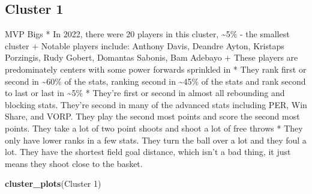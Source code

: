 \documentclass[
]{article}
\newenvironment{Shaded}{\begin{snugshade}}{\end{snugshade}}
\newcommand{\FunctionTok}[1]{\textcolor[rgb]{0.13,0.29,0.53}{\textbf{#1}}}
\newcommand{\NormalTok}[1]{#1}
\newcommand{\StringTok}[1]{\textcolor[rgb]{0.31,0.60,0.02}{#1}}
\begin{document}
\hypertarget{cluster-1}{%
\subsection{Cluster 1}\label{cluster-1}}

MVP Bigs * In 2022, there were 20 players in this cluster,
\textasciitilde5\% - the smallest cluster + Notable players include:
Anthony Davis, Deandre Ayton, Kristaps Porzingis, Rudy Gobert, Domantas
Sabonis, Bam Adebayo + These players are predominately centers with some
power forwards sprinkled in * They rank first or second in
\textasciitilde60\% of the stats, ranking second in \textasciitilde45\%
of the stats and rank second to last or last in \textasciitilde5\% *
They're first or second in almost all rebounding and blocking stats.
They're second in many of the advanced stats including PER, Win Share,
and VORP. They play the second most points and score the second most
points. They take a lot of two point shoots and shoot a lot of free
throws * They only have lower ranks in a few stats. They turn the ball
over a lot and they foul a lot. They have the shortest field goal
distance, which isn't a bad thing, it just means they shoot close to the
basket.

\begin{Shaded}
\begin{Highlighting}[]
\FunctionTok{cluster\_plots}\NormalTok{(}\StringTok{\textquotesingle{}Cluster 1\textquotesingle{}}\NormalTok{)}
\end{Highlighting}
\end{Shaded}
\end{document}
